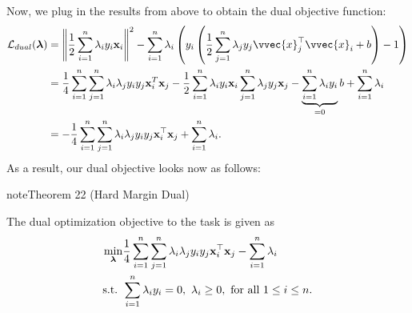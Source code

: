 \documentclass[letterpaper,10pt,english]{jupyterBook}
\begin{document}
\sphinxAtStartPar
Now, we plug in the results from above to obtain the dual objective function:
\begin{align*}
{\cal L}_{dual}(\boldsymbol{\lambda}) &=\left\lVert \frac12\sum_{i=1}^{n} \lambda_{i} y_{i} {\bf x}_{i}\right\rVert^2 - \sum_{i=1}^n \lambda_i\left(y_i\left(\frac12\sum_{j=1}^{n} \lambda_{j} y_{j}\vvec{x}_j^\top\vvec{x}_i+b\right)-1\right)\\
&=\frac{1}{4} \sum_{i=1}^{n} \sum_{j=1}^{n} \lambda_{i} \lambda_{j} y_{i} y_{j} {\bf x}_{i}^{T} {\bf x}_{j}  - \frac12\sum_{i=1}^{n} \lambda_{i}y_{i} {\bf x}_{i} \sum_{j=1}^{n} \lambda_{j} y_{j} {\bf x}_{j} - \underbrace{\sum_{i=1}^{n} \lambda_{i} y_{i}}_{= 0} b + \sum_{i=1}^{n} \lambda_{i} \\
&= - \frac{1}{4} \sum_{i=1}^{n} \sum_{j=1}^{n} \lambda_{i} \lambda_{j} y_{i} y_{j} {\bf x}_{i}^\top {\bf x}_{j} + \sum_{i=1}^{n} \lambda_{i}.
\end{align*}
\sphinxAtStartPar
As a result, our dual objective looks now as follows:
\label{classification_svms:theorem-3}
\begin{sphinxadmonition}{note}{Theorem 22 (Hard Margin Dual)}



\sphinxAtStartPar
The dual optimization objective to the {\hyperref[\detokenize{classification_svms:hard-margin-svm-task}]{}} task is given as
\begin{equation}\label{equation:classification_svms:svm_dual_hardmarg}
\begin{split}\begin{align*}
\min_{\boldsymbol{\lambda}} &  \frac{1}{4} \sum_{i=1}^{n} \sum_{j=1}^{n} \lambda_{i} \lambda_{j} y_{i} y_{j} {\bf x}_{i}^\top {\bf x}_{j} - \sum_{i=1}^{n} \lambda_{i} \\
\text{s.t. } &  \sum_{i=1}^{n} \lambda_{i} y_{i} = 0,\ 
\lambda_{i}\geq 0, \text{ for all } 1\leq i\leq n.
\end{align*}\end{split}
\end{equation}\end{sphinxadmonition}
\end{document}
